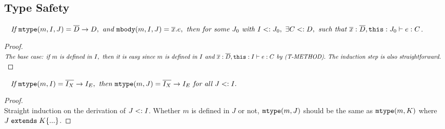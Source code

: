 \subsection{Type Safety}

\begin{lemma}~\label{lemma0}
$\textit{If } \texttt{mtype}(m, I, J) = \overline{D} \rightarrow D, \textit{ and } \texttt{mbody}(m, I, J) = \overline{x}.e, 
 \textit{ then for some } J_0 \textit{ with } I <: J_0, \  \exists C <: D, \textit{ such that }  
 \overline{x}:\overline{D}, \texttt{this}:J_0 \; {\vdash} \; e:C $.

 \begin{proof}~\\
 $\textit{The base case: if } m \textit{ is defined in } I, \textit{ then it is easy since } m 
 \textit{ is defined in } I \textit{ and } 
 \overline{x}:\overline{D}, \texttt{this} : I \; {\vdash} \; e : C \textit{ by (T-METHOD)}.
 \textit{ The induction step is also straightforward. }
 $
 \end{proof}
\end{lemma}


\begin{lemma}~\label{lemma2}
$\textit{If } \texttt{mtype}(m, I) = \overline{I_X} \rightarrow I_E, \textit{ then } \texttt{mtype}(m, J) = \overline{I_X} \rightarrow I_E 
\textit{ for all } J <: I.
$
\begin{proof}~\\
Straight induction on the derivation of $J <: I$. Whether $m$ is defined in $J$ or not, $\texttt{mtype}(m, J)$ should 
be the same as $\texttt{mtype}(m, K)$ where $J \; \texttt{extends} \; K \{...\}$.
\end{proof}
\end{lemma}


